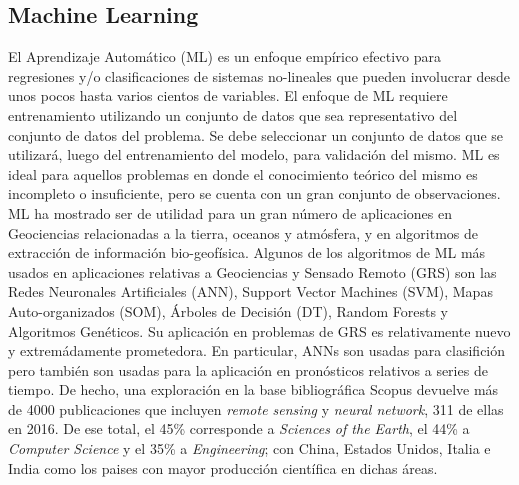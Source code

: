



\subsection{Machine Learning}

El Aprendizaje Automático (ML) es un enfoque empírico efectivo para
regresiones y/o clasificaciones de sistemas no-lineales que pueden involucrar desde
unos pocos hasta varios cientos de variables. El enfoque de ML requiere
entrenamiento utilizando un conjunto de datos que sea representativo del conjunto
de datos del problema. Se debe seleccionar un conjunto de datos que se utilizará,
luego del entrenamiento del modelo, para validación del mismo.
ML es ideal para aquellos problemas en donde el conocimiento teórico del mismo
es incompleto o insuficiente, pero se cuenta con un gran conjunto de observaciones.
ML ha mostrado ser de utilidad para un gran número de aplicaciones en Geociencias
relacionadas a la tierra, oceanos y atmósfera, y en algoritmos de extracción
de información bio-geofísica.
Algunos de los algoritmos de ML más usados en aplicaciones relativas a
Geociencias y Sensado Remoto (GRS) son las Redes Neuronales Artificiales (ANN),
Support Vector Machines (SVM), Mapas Auto-organizados (SOM), Árboles de Decisión (DT),
Random Forests y Algoritmos Genéticos. Su aplicación en problemas de GRS es
relativamente nuevo y extremádamente prometedora. En particular, ANNs son
usadas para clasifición pero también son usadas para la aplicación en pronósticos
relativos a series de tiempo.
De hecho, una exploración en la base bibliográfica Scopus devuelve más de 4000
publicaciones que incluyen \textit{remote sensing} y \textit{neural network},
311 de ellas en 2016. De ese total, el 45\% corresponde a
\textit{Sciences of the Earth}, el 44\% a \textit{Computer Science} y el 35\% a
\textit{Engineering}; con China, Estados Unidos, Italia e India como los paises
con mayor producción científica en dichas áreas.



